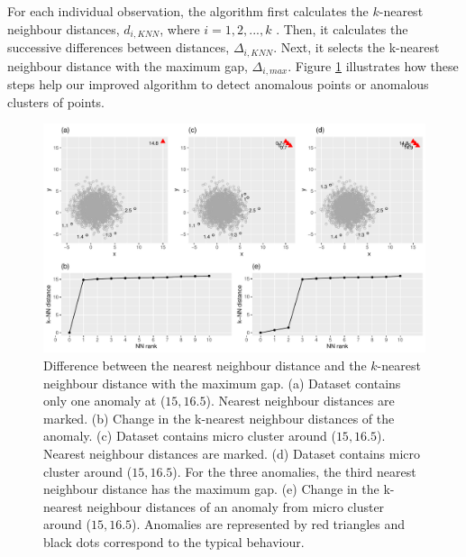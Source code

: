 \documentclass[11pt,a4paper,]{article}
\theoremstyle{definition}
\theoremstyle{definition}
\theoremstyle{definition}
\theoremstyle{remark}
\begin{document}
For each individual observation, the algorithm first calculates the \(k\)-nearest neighbour distances, \(d_{i,KNN}\), where \(i= 1,2,...,k\) . Then, it calculates the successive differences between distances, \(\Delta_{i,KNN}\). Next, it selects the k-nearest neighbour distance with the maximum gap, \(\Delta_{i, max}\). Figure \ref{fig:whyknn} illustrates how these steps help our improved algorithm to detect anomalous points or anomalous clusters of points.

\begin{figure}[h]

{\centering \includegraphics[width=1\linewidth]{figure/whyknn-1} 

}

\caption{Difference between the nearest neighbour distance and the $k$-nearest neighbour distance with the maximum gap. (a) Dataset contains only one anomaly at ($15,16.5$). Nearest neighbour distances are marked. (b) Change in the k-nearest neighbour distances of the anomaly. (c) Dataset contains micro cluster around ($15,16.5$). Nearest neighbour distances are marked. (d) Dataset contains micro cluster around ($15,16.5$). For the three anomalies, the third nearest neighbour distance has the maximum gap.  (e)  Change in the k-nearest neighbour distances of an anomaly from micro cluster around ($15,16.5$). Anomalies are represented by red triangles and black dots  correspond to the typical behaviour.}\label{fig:whyknn}
\end{figure}
\end{document}
